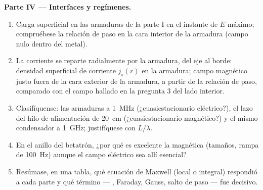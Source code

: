 \begin{problem}
\medskip
\noindent\textbf{Parte IV --- Interfaces y regímenes.}
\begin{enumerate}[resume]
  \item Carga superficial en las armaduras de la parte I en el instante de
        $E$ máximo; compruébese la relación de paso en la cara interior de
        la armadura (campo nulo dentro del metal).
  \item La corriente se reparte radialmente por la armadura, del eje al
        borde: densidad superficial de corriente $j_s(r)$ en la armadura; campo
        magnético justo fuera de la cara exterior de la armadura, a partir
        de la relación de paso, comparado con el campo hallado en la
        pregunta 3 del lado interior.
  \item Clasifíquense: las armaduras a \qty{1}{MHz} (¿cuasiestacionario
        eléctrico?), el lazo del hilo de alimentación de \qty{20}{cm}
        (¿cuasiestacionario magnético?) y el mismo condensador a
        \qty{1}{GHz}; justifíquese con $L/\lambda$.
  \item En el anillo del betatrón, ¿por qué es excelente la  magnética (tamaños, rampa de \qty{100}{Hz}) aunque
        el campo eléctrico sea allí esencial?
  \item Resúmase, en una tabla, qué ecuación de Maxwell (local o integral)
        respondió a cada parte y qué término --- , Faraday, Gauss, salto de paso --- fue decisivo.
\end{enumerate}
\end{problem}
